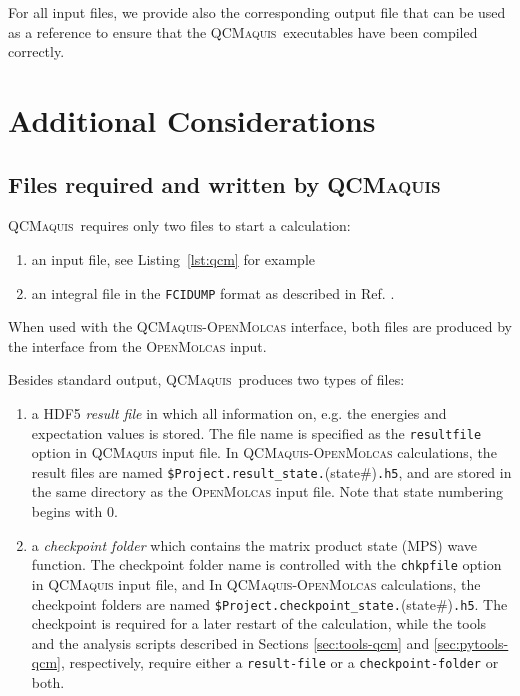 \documentclass[bibliography=totoc,12pt,a4paper]{scrartcl}
\newcommand{\mol}{\textsc{OpenMolcas}}
\newcommand{\qcm}{\textsc{QCMaquis}}
\newcommand{\kwd}[1]{\texttt{#1}}
\begin{document}
For all input files, we provide also the corresponding output file that can be used as a reference to ensure that the \qcm\ executables have been compiled correctly.

\section{Additional Considerations}

\subsection{Files required and written by \qcm}\label{sec:file-req-qcm}

\qcm\ requires only two files to start a calculation:

\begin{enumerate}
 \item an input file, see Listing~\ref{lst:qcm} for example
 \item an integral file in the \texttt{FCIDUMP} format as described in Ref. .
\end{enumerate}

When used with the \qcm{}-\mol{} interface, both files are produced by the interface from the \mol{} input.

Besides standard output, \qcm\ produces two types of files:
\begin{enumerate}
 \item a HDF5 \emph{result file} in which all information on, e.g. the energies and expectation values is stored. The file name is specified as the \kwd{resultfile} option in \qcm{} input file. In \qcm{}-\mol{} calculations, the result files are named \texttt{\$Project.result\_state.}(state\#)\texttt{.h5}, and are stored in the same directory as the \mol{} input file. Note that state numbering begins with 0.
 \item a \emph{checkpoint folder} which contains the matrix product state (MPS) wave function. The checkpoint folder name is controlled with the \kwd{chkpfile} option in \qcm{} input file, and In \qcm{}-\mol{} calculations, the checkpoint folders are named \texttt{\$Project.checkpoint\_state.}(state\#)\texttt{.h5}. The checkpoint is required for a later restart of the calculation, while the tools and the analysis scripts
described in Sections \ref{sec:tools-qcm} and \ref{sec:pytools-qcm}, respectively, require either a \texttt{result-file} or a
\texttt{checkpoint-folder} or both.
\end{enumerate}
\end{document}
